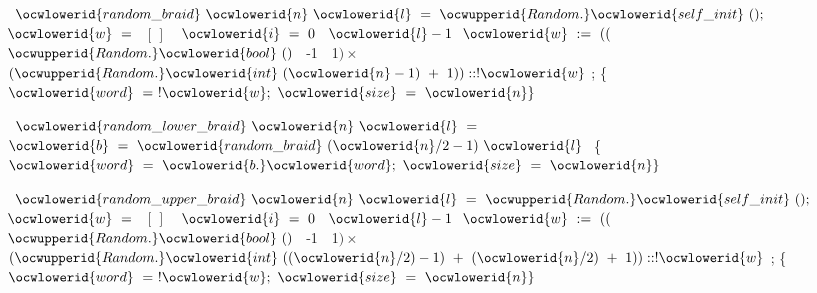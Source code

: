 \documentclass[12pt]{article}
\begin{document}
\ocweol
\label{Braid.ml:954}%
\medskip
\ocwbegincode{}\ocwindent{0.00em}
~$\ocwlowerid{random\_braid}~\ocwlowerid{n}~\ocwlowerid{l}~=$\ocweol
\ocwindent{2.00em}
$\ocwupperid{Random.}\ocwlowerid{self\_init}~();$\ocweol
\ocwindent{2.00em}
~$\ocwlowerid{w}~=~$~$[\,]~$\ocweol
\ocwindent{2.00em}
~$\ocwlowerid{i}~=~0~$~$\ocwlowerid{l}-1~$\ocweol
\ocwindent{4.00em}
$\ocwlowerid{w}~:=~(($~$\ocwupperid{Random.}\ocwlowerid{bool}~()~$~-1~~1$)\times{}$\ocweol
\ocwindent{7.00em}
$(\ocwupperid{Random.}\ocwlowerid{int}~(\ocwlowerid{n}-1)~+~1))::!\ocwlowerid{w}$\ocweol
\ocwindent{2.00em}
;\ocweol
\ocwindent{2.00em}
\{$\ocwlowerid{word}~=~!\ocwlowerid{w};~\ocwlowerid{size}~=~\ocwlowerid{n}\}$\medskip

\label{Braid.ml:1179}%
\ocwindent{0.00em}
~$\ocwlowerid{random\_lower\_braid}~\ocwlowerid{n}~\ocwlowerid{l}~=$\ocweol
\ocwindent{2.00em}
~$\ocwlowerid{b}~=~\ocwlowerid{random\_braid}~(\ocwlowerid{n}/2-1)~\ocwlowerid{l}~$\ocweol
\ocwindent{3.00em}
\{$\ocwlowerid{word}~=~\ocwlowerid{b.}\ocwlowerid{word};~\ocwlowerid{size}~=~\ocwlowerid{n}\}$\medskip

\label{Braid.ml:1281}%
\ocwindent{0.00em}
~$\ocwlowerid{random\_upper\_braid}~\ocwlowerid{n}~\ocwlowerid{l}~=$\ocweol
\ocwindent{2.00em}
$\ocwupperid{Random.}\ocwlowerid{self\_init}~();$\ocweol
\ocwindent{2.00em}
~$\ocwlowerid{w}~=~$~$[\,]~$\ocweol
\ocwindent{2.00em}
~$\ocwlowerid{i}~=~0~$~$\ocwlowerid{l}-1~$\ocweol
\ocwindent{4.00em}
$\ocwlowerid{w}~:=~(($~$\ocwupperid{Random.}\ocwlowerid{bool}~()~$~-1~~1$)\times{}~$\ocweol
\ocwindent{7.00em}
$(\ocwupperid{Random.}\ocwlowerid{int}~((\ocwlowerid{n}/2)-1)~+~(\ocwlowerid{n}/2)~+~1))::!\ocwlowerid{w}$\ocweol
\ocwindent{2.00em}
;\ocweol
\ocwindent{2.00em}
\{$\ocwlowerid{word}~=~!\ocwlowerid{w};~\ocwlowerid{size}~=~\ocwlowerid{n}\}$\ocweol
\ocwendcode{}
\end{document}
